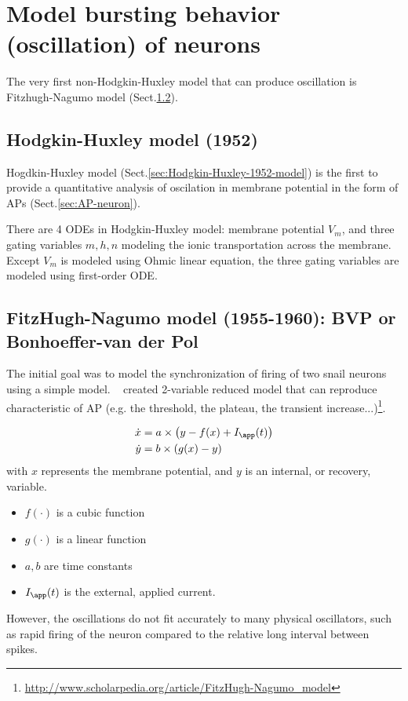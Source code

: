 \chapter{Model bursting behavior (oscillation) of neurons}

The very first non-Hodgkin-Huxley model that can produce oscillation is
Fitzhugh-Nagumo model (Sect.\ref{sec:fitzh-nagumo-model}).


\section{Hodgkin-Huxley model (1952)}

Hogdkin-Huxley model (Sect.\ref{sec:Hodgkin-Huxley-1952-model}) is the first to
provide a quantitative analysis of oscilation in membrane potential in the form
of APs (Sect.\ref{sec:AP-neuron}).

There are 4 ODEs in Hodgkin-Huxley model: membrane potential $V_m$, and three
gating variables $m, h, n$ modeling the ionic transportation across the
membrane. Except $V_m$ is modeled using Ohmic linear equation, the three gating
variables are modeled using first-order ODE.


\section{FitzHugh-Nagumo model (1955-1960): BVP or Bonhoeffer-van der Pol}
\label{sec:fitzh-nagumo-model}
\label{sec:BVP}
\label{sec:Bonhoeffer-van-der-Pol}


The initial goal was to model the synchronization of firing of two snail neurons
using a simple model. ~\citep{fitzhugh1960tph} created 2-variable reduced model
that can reproduce characteristic of AP (e.g.
the threshold, the plateau, the transient
increase...)\footnote{\url{http://www.scholarpedia.org/article/FitzHugh-Nagumo_model}}.

\begin{equation}
\begin{split}
\dot{x} &= a \times \left( y  - f(x) + I_\app(t) \right) \\
\dot{y} &= b \times \left( g(x) - y \right)
\end{split}
\end{equation}
with $x$ represents the membrane potential, and $y$ is an internal, or recovery,
variable. 
\begin{itemize}
  \item $f(\cdot)$ is a cubic function
  \item $g(\cdot)$ is a linear function
  \item $a,b$ are time constants
  \item $I_\app(t)$ is the external, applied current. 
\end{itemize}
However, the oscillations do not fit accurately to many physical oscillators,
such as rapid firing of the neuron compared to the relative long interval
between spikes.

